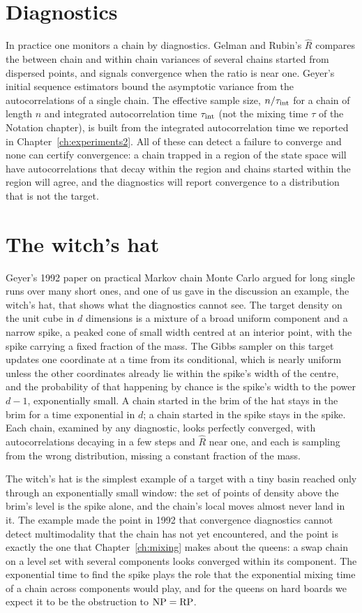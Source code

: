 \section{Diagnostics}

In practice one monitors a chain by diagnostics. Gelman and Rubin's $\hat R$ compares the between chain and within chain variances of several chains started from dispersed points, and signals convergence when the ratio is near one. Geyer's initial sequence estimators bound the asymptotic variance from the autocorrelations of a single chain. The effective sample size, $n / \tau_{\rm int}$ for a chain of length $n$ and integrated autocorrelation time $\tau_{\rm int}$ (not the mixing time $\tau$ of the Notation chapter), is built from the integrated autocorrelation time we reported in Chapter~\ref{ch:experiments2}. All of these can detect a failure to converge and none can certify convergence: a chain trapped in a region of the state space will have autocorrelations that decay within the region and chains started within the region will agree, and the diagnostics will report convergence to a distribution that is not the target.

\section{The witch's hat}

Geyer's 1992 paper on practical Markov chain Monte Carlo argued for long single runs over many short ones, and one of us gave in the discussion an example, the witch's hat, that shows what the diagnostics cannot see. The target density on the unit cube in $d$ dimensions is a mixture of a broad uniform component and a narrow spike, a peaked cone of small width centred at an interior point, with the spike carrying a fixed fraction of the mass. The Gibbs sampler on this target updates one coordinate at a time from its conditional, which is nearly uniform unless the other coordinates already lie within the spike's width of the centre, and the probability of that happening by chance is the spike's width to the power $d - 1$, exponentially small. A chain started in the brim of the hat stays in the brim for a time exponential in $d$; a chain started in the spike stays in the spike. Each chain, examined by any diagnostic, looks perfectly converged, with autocorrelations decaying in a few steps and $\hat R$ near one, and each is sampling from the wrong distribution, missing a constant fraction of the mass.

The witch's hat is the simplest example of a target with a tiny basin reached only through an exponentially small window: the set of points of density above the brim's level is the spike alone, and the chain's local moves almost never land in it. The example made the point in 1992 that convergence diagnostics cannot detect multimodality that the chain has not yet encountered, and the point is exactly the one that Chapter~\ref{ch:mixing} makes about the queens: a swap chain on a level set with several components looks converged within its component. The exponential time to find the spike plays the role that the exponential mixing time of a chain across components would play, and for the queens on hard boards we expect it to be the obstruction to $\mathrm{NP} = \mathrm{RP}$.

